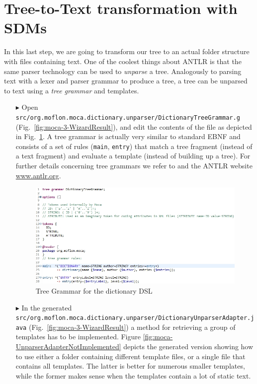 \section{Tree-to-Text transformation with SDMs}
\label{chap:tree-to-text}

In this last step, we are going to transform our tree to an actual folder structure with files containing text.
One of the coolest things about ANTLR is that the same parser technology can be used to \emph{unparse} a tree.
Analogously to parsing text with a lexer and parser grammar to produce a tree, a tree can be unparsed to text using a \emph{tree grammar} and templates.
\begin{enumerate}
\item[$\blacktriangleright$] Open \texttt{src/org.moflon.moca.dictionary.unparser/Dictionary\-Tree\-Grammar.g} (Fig.~\ref{fig:moca-3-WizardResult}), and edit the contents of the file as depicted in Fig.~\ref{fig:moca-DictionaryTreeGrammar}.
A tree grammar is actually very similar to standard EBNF and consists of a set of rules (\texttt{main}, \texttt{entry}) that match a tree fragment (instead of a text fragment) and evaluate a template (instead of building up a tree).
For further details concerning tree grammars we refer to \cite{ANTLR} and the
ANTLR website \url{www.antlr.org}.

\begin{figure}[!htbp]
\begin{center}
 \includegraphics[width=\textwidth]{pics/moca/5MocaTreeToText/DictionaryTreeGrammar}
  \caption{Tree Grammar for the dictionary DSL} 
  \label{fig:moca-DictionaryTreeGrammar}
\end{center}
\end{figure} 

\item[$\blacktriangleright$] In the generated \texttt{src/org.moflon.moca.dictionary.unparser/Dic\-tion\-ary\-Unparser\-Adapter.java} (Fig.~\ref{fig:moca-3-WizardResult}) a method for retrieving a group of templates has to be implemented.
Figure \ref{fig:moca-UnparserAdapterNotImplemented} depicts the generated version showing how to use either a folder containing different template files, or a single file that contains all templates.
The latter is better for numerous smaller templates, while the former makes sense when the templates contain a lot of static text.


\end{enumerate}
